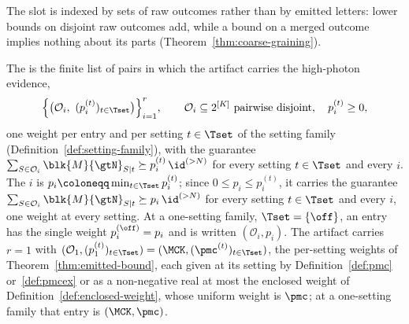 
The slot is indexed by sets of raw outcomes rather than by emitted letters:
lower bounds on disjoint raw outcomes add, while a bound on a merged outcome
implies nothing about its parts (Theorem~\ref{thm:coarse-graining}).

\begin{definition}\label{def:slot}
The
is the finite list of pairs in which the artifact carries the high-photon
evidence,
\begin{equation}\label{eq:slot}
  \Big\{\big(\mathcal{O}_i,\ (p^{(t)}_i)_{t\in\Tset}\big)\Big\}_{i=1}^{r},
  \qquad \mathcal{O}_i\subseteq2^{[K]}\ \text{pairwise disjoint},\quad
  p^{(t)}_i\ge0,
\end{equation}
one weight per entry and per setting $t\in\Tset$ of the setting family
(Definition~\ref{def:setting-family}), with the guarantee
$\sum_{S\in\mathcal{O}_i}\blk{M}{\gtN}_{S|t}\succeq p^{(t)}_i\,\id^{(>N)}$
for every setting $t\in\Tset$ and every $i$. The
$i$ is $p_i\coloneqq\min_{t\in\Tset}p^{(t)}_i$; since
$0\le p_i\le p^{(t)}_i$, it carries the guarantee
$\sum_{S\in\mathcal{O}_i}\blk{M}{\gtN}_{S|t}\succeq p_i\,\id^{(>N)}$ for
every setting $t\in\Tset$ and every $i$, one weight at every setting. At a
one-setting family, $\Tset=\{\off\}$, an entry has the single weight
$p^{(\off)}_i=p_i$ and is written $(\mathcal{O}_i,p_i)$. The artifact
carries $r=1$ with
$(\mathcal{O}_1,(p^{(t)}_1)_{t\in\Tset})=(\MCK,(\pmc^{(t)})_{t\in\Tset})$,
the per-setting weights of Theorem~\ref{thm:emitted-bound}, each given at its
setting by Definition~\ref{def:pmc} or~\ref{def:pmcex} or as a non-negative
real at most the enclosed weight of Definition~\ref{def:enclosed-weight},
whose uniform weight is $\pmc$; at a
one-setting family that entry is $(\MCK,\pmc)$.
\end{definition}
